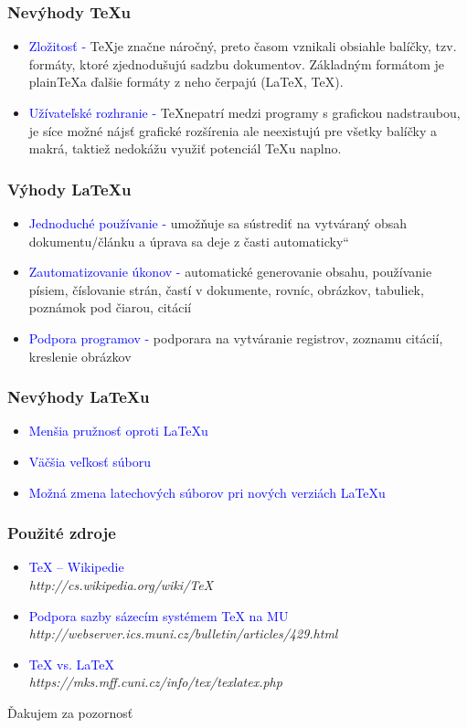 \documentclass[pdf]{beamer}
\newcommand{\myuv}[1]{\quotedblbase #1\textquotedblleft}
\begin{document}
\begin{frame}
\frametitle{Nevýhody \TeX u}
\begin{itemize}
\item{\textcolor{blue}{Zložitosť - }\TeX\hspace{4 pt}je značne náročný, preto časom vznikali obsiahle balíčky, tzv. formáty, ktoré zjednodušujú sadzbu dokumentov. Základným formátom je plain\TeX a ďalšie formáty z neho čerpajú (\LaTeX , \AmS\TeX).}
\item{\textcolor{blue}{Užívateľské rozhranie - }\TeX\hspace{4 pt}nepatrí medzi programy s grafickou nadstraubou, je síce možné nájsť grafické rozšírenia ale neexistujú pre všetky balíčky a makrá, taktiež nedokážu využiť potenciál \TeX u naplno.}
\end{itemize}
\end{frame}

\begin{frame}
\frametitle{Výhody \LaTeX u}
\begin{itemize}
\item{\textcolor{blue}{Jednoduché používanie - }umožňuje sa sústrediť na vytváraný obsah dokumentu/článku a úprava sa deje z časti \myuv{automaticky}}
\item{\textcolor{blue}{Zautomatizovanie úkonov - }automatické generovanie obsahu, používanie písiem, číslovanie strán, častí v dokumente, rovníc, obrázkov, tabuliek, poznámok pod čiarou, citácií}
\item{\textcolor{blue}{Podpora programov - }podporara na vytváranie registrov, zoznamu citácií, kreslenie obrázkov }
\end{itemize}
\end{frame}

\begin{frame}
\frametitle{Nevýhody \LaTeX u}
\begin{itemize}
\item{\textcolor{blue}{Menšia pružnosť oproti \LaTeX u}}
\item{\textcolor{blue}{Väčšia veľkosť súboru}}
\item{\textcolor{blue}{Možná zmena latechových súborov pri nových verziách \LaTeX u}}
\end{itemize}
\end{frame}

\begin{frame}
\frametitle{Použité zdroje}
\begin{itemize}
\item{\textcolor{blue}{TeX – Wikipedie}\\ \emph{http://cs.wikipedia.org/wiki/TeX}}
\item{\textcolor{blue}{Podpora sazby sázecím systémem TeX na MU}\\ \emph{http://webserver.ics.muni.cz/bulletin/articles/429.html}}
\item{\textcolor{blue}{TeX vs. LaTeX}\\ \emph{https://mks.mff.cuni.cz/info/tex/texlatex.php}}
\end{itemize}
\end{frame}

\begin{frame}
\begin{center}
\Huge{Ďakujem za pozornosť}
\end{center}
\end{frame}
\end{document}
